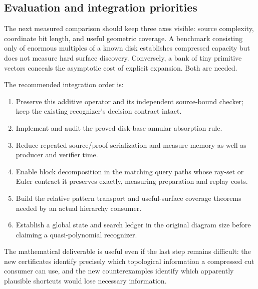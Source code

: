 \subsection{Evaluation and integration priorities}

The next measured comparison should keep three axes visible: source complexity,
coordinate bit length, and useful geometric coverage.  A benchmark consisting
only of enormous multiples of a known disk establishes compressed capacity but
does not measure hard surface discovery.  Conversely, a bank of tiny primitive
vectors conceals the asymptotic cost of explicit expansion.  Both are needed.

The recommended integration order is:
\begin{enumerate}
\item Preserve this additive operator and its independent source-bound checker;
keep the existing recognizer's decision contract intact.
\item Implement and audit the proved disk-base annular absorption rule.
\item Reduce repeated source/proof serialization and measure memory as well as
producer and verifier time.
\item Enable block decomposition in the matching query paths whose ray-set or
Euler contract it preserves exactly, measuring preparation and replay costs.
\item Build the relative pattern transport and useful-surface coverage theorems
needed by an actual hierarchy consumer.
\item Establish a global state and search ledger in the original diagram size
before claiming a quasi-polynomial recognizer.
\end{enumerate}

The mathematical deliverable is useful even if the last step remains difficult:
the new certificates identify precisely which topological information a
compressed cut consumer can use, and the new counterexamples identify which
apparently plausible shortcuts would lose necessary information.
